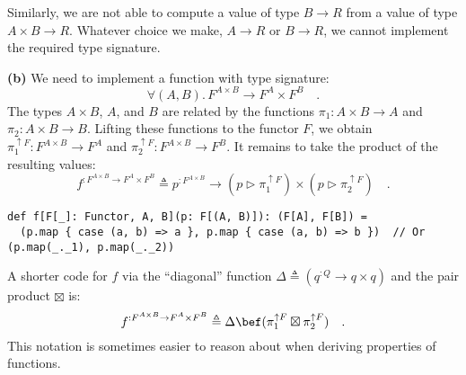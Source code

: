 Similarly, we are not able to compute a value of type $B\rightarrow R$
from a value of type $A\times B\rightarrow R$. Whatever choice we
make, $A\rightarrow R$ or $B\rightarrow R$, we cannot implement
the required type signature.

\textbf{(b)} We need to implement a function with type signature:
\[
\forall(A,B).\,F^{A\times B}\rightarrow F^{A}\times F^{B}\quad.
\]
The types $A\times B$, $A$, and $B$ are related by the functions
$\pi_{1}:A\times B\rightarrow A$ and $\pi_{2}:A\times B\rightarrow B$.
Lifting these functions to the functor $F$, we obtain $\pi_{1}^{\uparrow F}:F^{A\times B}\rightarrow F^{A}$
and $\pi_{2}^{\uparrow F}:F^{A\times B}\rightarrow F^{B}$. It remains
to take the product of the resulting values:
\[
f^{:F^{A\times B}\rightarrow F^{A}\times F^{B}}\triangleq p^{:F^{A\times B}}\rightarrow(p\triangleright\pi_{1}^{\uparrow F})\times(p\triangleright\pi_{2}^{\uparrow F})\quad.
\]
\begin{lstlisting}
def f[F[_]: Functor, A, B](p: F[(A, B)]): (F[A], F[B]) =
  (p.map { case (a, b) => a }, p.map { case (a, b) => b })  // Or (p.map(_._1), p.map(_._2))
\end{lstlisting}
A shorter code for $f$ via the \textsf{``}diagonal\textsf{''} function $\Delta\triangleq(q^{:Q}\rightarrow q\times q)$
and the pair product $\boxtimes$ is:
\[
f^{:F^{A\times B}\rightarrow F^{A}\times F^{B}}\triangleq\Delta\bef(\pi_{1}^{\uparrow F}\boxtimes\pi_{2}^{\uparrow F})\quad.
\]
This notation is sometimes easier to reason about when deriving properties
of functions.

